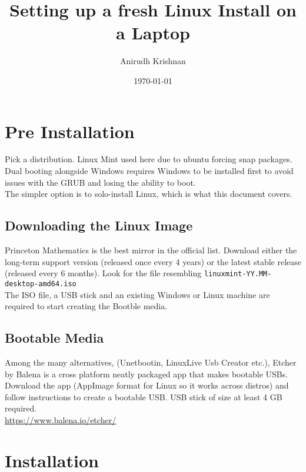 \documentclass[8pt,letterpaper,twocolumn]{article}
\title{Setting up a fresh Linux Install on a Laptop}
\author{Anirudh Krishnan}
\date{\today}
\begin{document}
\maketitle
\newpage

\tableofcontents
\newpage

\section{Pre Installation}

Pick a distribution. Linux Mint used here due to ubuntu forcing snap packages.
Dual booting alongside Windows requires Windows to be installed first to avoid
issues with the GRUB and losing the ability to boot.\\

The simpler option is to solo-install Linux, which is what this document covers.

\subsection{Downloading the Linux Image}

Princeton Mathematics is the best mirror in the official list. Download either the long-term support version 
(released once every 4 years) or the latest stable release (released every 6 months). 
Look for the file resembling \texttt{linuxmint-YY.MM-desktop-amd64.iso} \\

The ISO file, a USB stick and an existing Windows or Linux machine are required to start creating the Bootble media.



\subsection{Bootable Media}
Among the many alternatives, (Unetbootin, LinuxLive Usb Creator etc.), 
Etcher by Balena is a cross platform neatly packaged app that makes bootable USBs. 
Download the app (AppImage format for Linux so it works across distros) and follow instructions to create a bootable USB. 
USB stick of size at least 4 GB required.\\

\url{https://www.balena.io/etcher/} \\

\newpage

\section{Installation}
\end{document}
